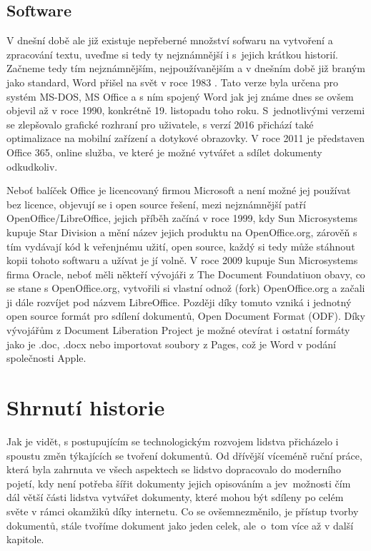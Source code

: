 \subsection{Software}

V dnešní době ale již existuje nepřeberné množství sofwaru na vytvoření a zpracování textu, uveďme si tedy ty nejznámnější i s~jejich krátkou historií. Začneme tedy
tím nejznámnějším, nejpoužívanějším a v dnešním době již braným jako standard, Word přišel na svět v roce 1983 \cite{word83}. Tato verze byla určena pro systém MS-DOS,
MS Office a s ním spojený Word jak jej známe dnes se ovšem objevil až v roce 1990, konkrétně 19. listopadu toho roku. S~jednotlivými verzemi se zlepšovalo grafické
rozhraní pro uživatele, s verzí 2016 přichází také optimalizace na mobilní zařízení a dotykové obrazovky. V roce 2011 je představen Office 365, online služba, ve
které je možné vytvářet a sdílet dokumenty odkudkoliv. \cite{word}

Neboť balíček Office je licencovaný firmou Microsoft a není možné jej používat bez licence, objevují se i open source řešení, mezi nejznámnější patří OpenOffice/LibreOffice,
jejich příběh začíná v roce 1999, kdy Sun Microsystems kupuje Star Division a mění název jejich produktu na OpenOffice.org, zárověň s tím vydávají kód k veřenjnému užití, open source,
každý si tedy může stáhnout kopii tohoto softwaru a užívat je jí volně. V roce 2009 kupuje Sun Microsystems firma Oracle, neboť měli někteří vývojáři z The Document Foundatiuon obavy,
co se stane s OpenOffice.org, vytvořili si vlastní odnož (fork) OpenOffice.org a začali ji dále rozvíjet pod názvem LibreOffice. Později díky tomuto vzniká i jednotný open source
formát pro sdílení dokumentů, Open Document Format (ODF). Díky vývojářům z Document Liberation Project je možné otevírat i ostatní formáty jako je .doc, .docx nebo importovat
soubory z Pages, což je Word v podání společnosti Apple. \cite{LibreHist}

\section{Shrnutí historie}

Jak je vidět, s postupujícím se technologickým rozvojem lidstva přicházelo i spoustu změn týkajících se tvoření dokumentů. Od dřívější víceméně ruční práce, která byla zahrnuta
ve všech aspektech se lidstvo dopracovalo do moderního pojetí, kdy není potřeba šířit dokumenty jejich opisováním a je\linebreak v~možnosti čím dál větší části lidstva vytvářet dokumenty,
které mohou být sdíleny po celém světe v rámci okamžiků díky internetu. Co se ovšem\linebreak nezměnilo, je přístup tvorby dokumentů, stále tvoříme dokument jako jeden celek, ale~o~tom více
až v další kapitole.